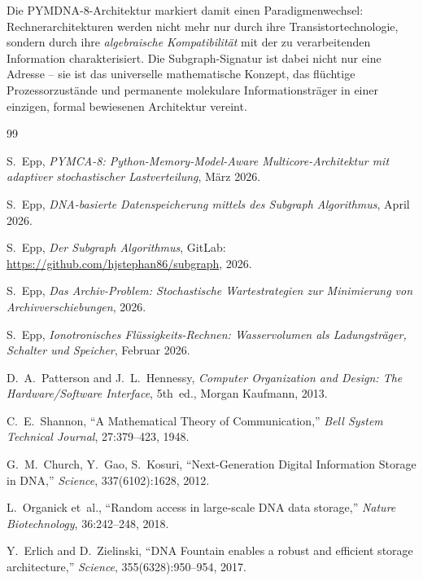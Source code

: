 ﻿\documentclass[a4paper,12pt]{article}
\theoremstyle{definition}
\begin{document}
Die PYMDNA-8-Architektur markiert damit einen Paradigmenwechsel:
Rechnerarchitekturen werden nicht mehr nur durch ihre
Transistortechnologie, sondern durch ihre \emph{algebraische Kompatibilität}
mit der zu verarbeitenden Information charakterisiert.
Die Subgraph-Signatur ist dabei nicht nur eine Adresse -- sie ist das
universelle mathematische Konzept, das flüchtige Prozessorzustände
und permanente molekulare Informationsträger in einer einzigen, formal
bewiesenen Architektur vereint.

\begin{thebibliography}{99}

  S.~Epp,
  \textit{PYMCA-8: Python-Memory-Model-Aware Multicore-Architektur mit
    adaptiver stochastischer Lastverteilung}, März 2026.

  S.~Epp,
  \textit{DNA-basierte Datenspeicherung mittels des Subgraph Algorithmus}, April 2026.

  S.~Epp,
  \textit{Der Subgraph Algorithmus},
  GitLab: \url{https://github.com/hjstephan86/subgraph}, 2026.

  S.~Epp,
  \textit{Das Archiv-Problem: Stochastische Wartestrategien zur Minimierung
    von Archivverschiebungen}, 2026.

  S.~Epp,
  \textit{Ionotronisches Flüssigkeits-Rechnen: Wasservolumen als
    Ladungsträger, Schalter und Speicher}, Februar 2026.

  D.~A.~Patterson and J.~L.~Hennessy,
  \textit{Computer Organization and Design: The Hardware/Software Interface},
  5th~ed., Morgan Kaufmann, 2013.

  C.~E.~Shannon,
  ``A Mathematical Theory of Communication,''
  \textit{Bell System Technical Journal}, 27:379--423, 1948.

  G.~M.~Church, Y.~Gao, S.~Kosuri,
  ``Next-Generation Digital Information Storage in DNA,''
  \textit{Science}, 337(6102):1628, 2012.

  L.~Organick et~al.,
  ``Random access in large-scale DNA data storage,''
  \textit{Nature Biotechnology}, 36:242--248, 2018.

  Y.~Erlich and D.~Zielinski,
  ``DNA Fountain enables a robust and efficient storage architecture,''
  \textit{Science}, 355(6328):950--954, 2017.


\end{thebibliography}
\end{document}
